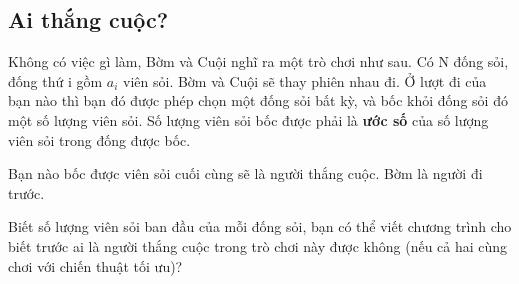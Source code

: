 \subsection{   Ai thắng cuộc?  }

   Không có việc gì làm, Bờm và Cuội nghĩ ra một trò chơi như sau. Có N đống sỏi, đống thứ i gồm $a_{i}$   viên sỏi. Bờm và Cuội sẽ thay phiên nhau đi. Ở lượt đi của bạn nào thì bạn đó được phép chọn một đống sỏi bất kỳ, và bốc  khỏi đống sỏi đó một số lượng viên sỏi. Số lượng viên sỏi bốc được phải là   \textbf{    ước số   }   của số lượng viên sỏi trong đống được bốc.  

   Bạn nào bốc được viên sỏi cuối cùng sẽ là người thắng cuộc. Bờm là người đi trước.  

   Biết số lượng viên sỏi ban đầu của mỗi đống sỏi, bạn có thể viết chương trình cho biết trước ai là người thắng cuộc trong trò chơi này được không (nếu cả hai cùng chơi với chiến thuật tối ưu)?